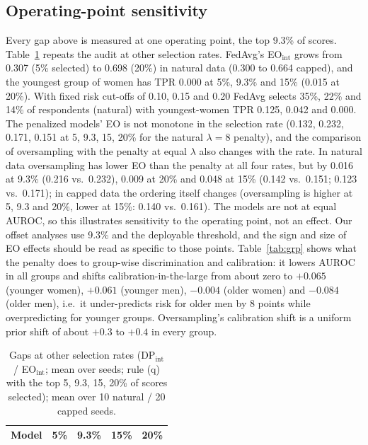 \subsection{Operating-point sensitivity}
\label{sec:op}
Every gap above is measured at one operating point, the top 9.3\% of scores. Table~\ref{tab:op} repeats the audit at other selection rates. FedAvg's EO$_\text{int}$ grows from 0.307 (5\% selected) to 0.698 (20\%) in natural data (0.300 to 0.664 capped), and the youngest group of women has TPR 0.000 at 5\%, 9.3\% and 15\% (0.015 at 20\%). With fixed risk cut-offs of 0.10, 0.15 and 0.20 FedAvg selects 35\%, 22\% and 14\% of respondents (natural) with youngest-women TPR 0.125, 0.042 and 0.000. The penalized models' EO is not monotone in the selection rate (0.132, 0.232, 0.171, 0.151 at 5, 9.3, 15, 20\% for the natural $\lambda{=}8$ penalty), and the comparison of oversampling with the penalty at equal $\lambda$ also changes with the rate. In natural data oversampling has lower EO than the penalty at all four rates, but by 0.016 at 9.3\% (0.216 vs.\ 0.232), 0.009 at 20\% and 0.048 at 15\% (0.142 vs.\ 0.151; 0.123 vs.\ 0.171); in capped data the ordering itself changes (oversampling is higher at 5, 9.3 and 20\%, lower at 15\%: 0.140 vs.\ 0.161). The models are not at equal AUROC, so this illustrates sensitivity to the operating point, not an effect. Our offset analyses use 9.3\% and the deployable threshold, and the sign and size of EO effects should be read as specific to those points. Table~\ref{tab:grp} shows what the penalty does to group-wise discrimination and calibration: it lowers AUROC in all groups and shifts calibration-in-the-large from about zero to $+0.065$ (younger women), $+0.061$ (younger men), $-0.004$ (older women) and $-0.084$ (older men), i.e.\ it under-predicts risk for older men by 8 points while overpredicting for younger groups. Oversampling's calibration shift is a uniform prior shift of about $+0.3$ to $+0.4$ in every group.

\begin{table}[t]
\centering
\caption{Gaps at other selection rates (DP$_\text{int}$ / EO$_\text{int}$; mean over seeds; rule (q) with the top 5, 9.3, 15, 20\% of scores selected); mean over 10 natural / 20 capped seeds.}
\label{tab:op}
\scriptsize
\setlength{\tabcolsep}{2.5pt}
\begin{tabular}{lcccc}
\toprule
Model & 5\% & 9.3\% & 15\% & 20\%\\
\midrule

\bottomrule
\end{tabular}
\end{table}


